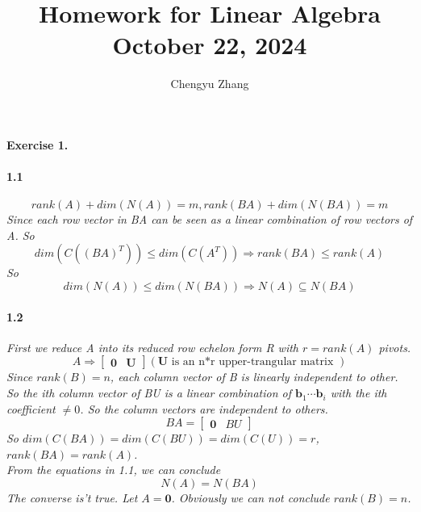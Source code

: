 \documentclass{article}
\title{\vspace*{-3.5cm}Homework for Linear Algebra \\October 22, 2024}
\author{Chengyu Zhang}
\date{}
\begin{document}
\maketitle

\paragraph{Exercise 1.}
  \paragraph{1.1}
    \textit{
      \[
      rank(A)+dim(N(A))=m , rank(BA)+dim(N(BA)) = m
      \]
      Since each row vector in BA can be seen as a linear combination of row vectors of A. So
      \[
      dim(C((BA)^T)) \leq dim(C(A^T)) \Rightarrow rank (BA) \leq rank(A) 
      \] 
      So 
      \[
      dim(N(A)) \leq dim(N(BA)) \Rightarrow N(A) \subseteq N(BA)
      \]
    }
  \paragraph{1.2}
    \textit{
       First we reduce A into its reduced row echelon form R with $r=rank(A)$ pivots.
       \[
       A \Rightarrow \begin{bmatrix}
        \mathbf{0} & \mathbf{U}
       \end{bmatrix}
       (\mathbf{U} \text{ is an n*r upper-trangular matrix })
       \]
       Since $rank(B)=n$, each column vector of B is linearly independent to other.\\ 
       So the ith column vector of BU is a linear combination of $\mathbf{b}_1 \cdots \mathbf{b}_i$ with the ith coefficient $\neq 0$. So the column vectors are independent to others.\\
       \[
       BA=\begin{bmatrix}
        \mathbf{0} & BU
       \end{bmatrix}
       \]
       So $dim(C(BA))=dim(C(BU))=dim(C(U))=r$, $rank(BA)=rank(A)$.\\
       From the equations in 1.1, we can conclude
        \[
         N(A)=N(BA)
       \]
       The converse is't true. Let $A=\mathbf{0}$. Obviously we can not conclude $rank(B)=n$.
    }
\end{document}
